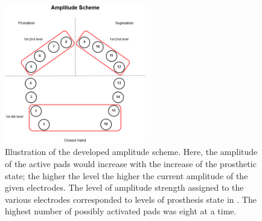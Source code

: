 \begin{figure}[H]                 
	\includegraphics[width=0.55\textwidth]{figures/El_array_amplitude}  
	\caption{Illustration of the developed amplitude scheme. Here, the amplitude of the active pads would increase with the increase of the prosthetic state; the higher the level the higher the current amplitude of the given electrodes. The level of amplitude strength assigned to the various electrodes corresponded to levels of prosthesis state in . The highest number of possibly activated pads was eight at a time.}
	\label{fig:amplitude} 
\end{figure}






